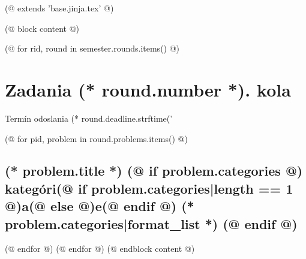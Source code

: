 (@ extends 'base.jinja.tex' @)

(@ block content @)
    \vspace*{15mm}
    
    \newpage
    

    (@ for rid, round in semester.rounds.items() @)%
        \newpage
        {
            \section{Zadania (* round.number *). kola}%
            \centering%
            \vspace*{-5mm}%
            Termín odoslania (* round.deadline.strftime('%
        }

        (@ for pid, problem in round.problems.items() @)%
        \setcounter{volume}{(* volume.number *)}%
        \setcounter{semester}{(* semester.number *)}%
        \setcounter{round}{(* round.number *)}%
        \setcounter{problem}{(* problem.number *)}%

        \subsection{%
            \texorpdfstring{%
                \large \textbf{(* problem.title *)}%
                (@ if problem.categories @)%
                \normalsize \hfill kategóri(@ if problem.categories|length == 1 @)a(@ else @)e(@ endif @) (* problem.categories|format_list *)%
                (@ endif @)
            }{%
                (* round.number *).(* problem.number *) (* problem.title *)%
            }%
        }%
        (@ endfor @)
    (@ endfor @)
(@ endblock content @)
